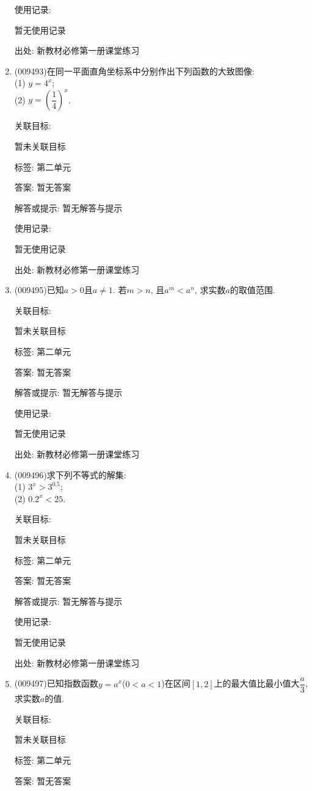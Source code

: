 \documentclass[10pt,a4paper]{article}
\begin{document}
\begin{enumerate}[1.]
使用记录:

暂无使用记录


出处: 新教材必修第一册课堂练习
\item { (009493)}在同一平面直角坐标系中分别作出下列函数的大致图像:\\
(1) $y=4^x$;\\
(2) $y=(\dfrac 14)^x$.


关联目标:

暂未关联目标



标签: 第二单元

答案: 暂无答案

解答或提示: 暂无解答与提示

使用记录:

暂无使用记录


出处: 新教材必修第一册课堂练习
\item { (009495)}已知$a>0$且$a\ne 1$. 若$m>n$, 且$a^m<a^n$, 求实数$a$的取值范围.


关联目标:

暂未关联目标



标签: 第二单元

答案: 暂无答案

解答或提示: 暂无解答与提示

使用记录:

暂无使用记录


出处: 新教材必修第一册课堂练习
\item { (009496)}求下列不等式的解集:\\
(1) $3^x>3^{0.5}$;\\
(2) $0.2^x<25$.


关联目标:

暂未关联目标



标签: 第二单元

答案: 暂无答案

解答或提示: 暂无解答与提示

使用记录:

暂无使用记录


出处: 新教材必修第一册课堂练习
\item { (009497)}已知指数函数$y=a^x$($0<a<1$)在区间$[1, 2]$上的最大值比最小值大$\dfrac a3$, 求实数$a$的值.


关联目标:

暂未关联目标



标签: 第二单元

答案: 暂无答案


\end{enumerate}
\end{document}
